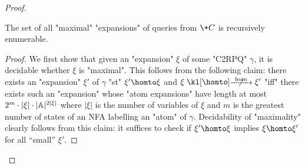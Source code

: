 \begin{proof}
    \begin{proposition}
        The set of all "maximal" "expansions" of queries from $\+C$ is recursively enumerable.
    \end{proposition}

    \begin{proof}
        \AP We first show that given an "expansion" $\xi$ of some "C2RPQ" $\gamma$, it is 
        decidable whether $\xi$ is "maximal". This follows from the following claim:
        there exists an "expansion" $\xi'$ of $\gamma$ "st" $\xi' \homto \xi$ and
        $\xi \nothomto \xi'$ "iff"
        there exists such an "expansion" whose "atom expansions" have length at most
        $2^m \cdot |\xi|\cdot |\mathbb{A}|^{2|\xi|}$ where $|\xi|$ is the number of variables of $\xi$ and
        $m$ is the greatest number of states of an NFA labelling an "atom" of $\gamma$. 
        Decidability of "maximality" clearly follows from this claim: it suffices to check if 
        $\xi' \homto \xi$ implies $\xi \homto \xi'$ for all ``small'' $\xi'$.


\end{proof}
\end{proof}
